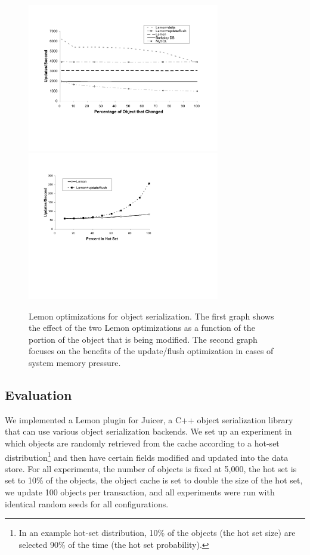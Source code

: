 \documentclass[10pt,letterpaper,twocolumn,english]{article}
\newcommand{\yad}{Lemon\xspace}
\newcommand{\oasys}{Juicer\xspace}
\begin{document}
\begin{figure}[t!]
\includegraphics[width=3.3in]{object-diff.pdf}
\hspace{.3in}
\includegraphics[width=3.3in]{mem-pressure.pdf}
\vspace{-.15in}
\caption{\sf \label{fig:OASYS}
\yad optimizations for object
serialization. The first graph shows the effect of the two \yad
optimizations as a function of the portion of the object that is being
modified. The second graph focuses on the 
benefits of the update/flush optimization in cases of system
memory pressure.}
\end{figure}

\subsection{Evaluation}

We implemented a \yad plugin for \oasys, a C++ object serialization
library that can use various object serialization backends. 
We set up an experiment in which objects are randomly
retrieved from the cache according to a hot-set distribution\footnote{In
an example hot-set distribution, 10\% of the objects (the hot set size) are
selected 90\% of the time (the hot set probability).} 
and then have certain fields modified and
updated into the data store. For all experiments, the number of objects
is fixed at 5,000, the
hot set is set to 10\% of the objects, the object cache is set to
double the size of the hot set, we update 100 objects per
transaction, and all experiments were run with identical random seeds 
for all configurations.
\end{document}
